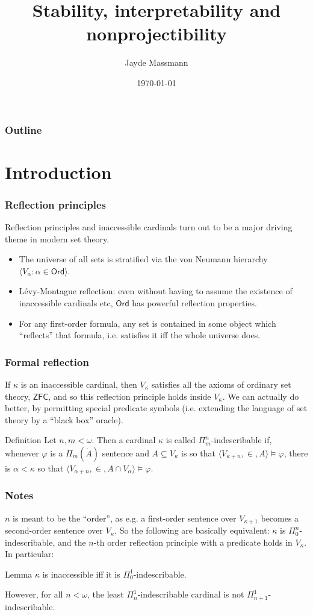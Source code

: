 \documentclass{beamer}
\title{Stability, interpretability and nonprojectibility}
\author{Jayde Massmann}
\date{\today}
\newcommand{\Ord}{\mathsf{Ord}}
\newcommand{\ZFC}{\mathsf{ZFC}}
\begin{document}
\frame{\titlepage}

\begin{frame}
\frametitle{Outline}
\tableofcontents
\end{frame}

\section{Introduction}

\begin{frame}
\frametitle{Reflection principles}
Reflection principles and inaccessible cardinals turn out to be a major driving theme in modern set theory. \pause

\begin{itemize}
    \item The universe of all sets is stratified via the von Neumann hierarchy $\langle V_\alpha: \alpha \in \Ord \rangle$.
    \item Lévy-Montague reflection: even without having to assume the existence of inaccessible cardinals etc, $\Ord$ has powerful reflection properties.
    \item For any first-order formula, any set is contained in some object which ``reflects'' that formula, i.e. satisfies it iff the whole universe does.
\end{itemize}
\end{frame}

\begin{frame}
\frametitle{Formal reflection}
If $\kappa$ is an inaccessible cardinal, then $V_\kappa$ satisfies all the axioms of ordinary set theory, $\ZFC$, and so this reflection principle holds inside $V_\kappa$. We can actually do better, by permitting special predicate symbols (i.e. extending the language of set theory by a ``black box'' oracle).

\begin{block}{Definition}
Let $n, m < \omega$. Then a cardinal $\kappa$ is called $\Pi^n_m$-indescribable if, whenever $\varphi$ is a $\Pi_m(\dot{A})$ sentence and $A \subseteq V_\kappa$ is so that $\langle V_{\kappa+n}, \in, A \rangle \models \varphi$, there is $\alpha < \kappa$ so that $\langle V_{\alpha+n}, \in, A \cap V_\alpha \rangle \models \varphi$.
\end{block}
\end{frame}

\begin{frame}
\frametitle{Notes}
$n$ is meant to be the ``order'', as e.g. a first-order sentence over $V_{\kappa+1}$ becomes a second-order sentence over $V_\kappa$. So the following are basically equivalent: $\kappa$ is $\Pi^n_0$-indescribable, and the $n$-th order reflection principle with a predicate holds in $V_\kappa$. In particular:

\begin{block}{Lemma}
$\kappa$ is inaccessible iff it is $\Pi^1_0$-indescribable.
\end{block}

However, for all $n < \omega$, the least $\Pi^1_n$-indescribable cardinal is not $\Pi^1_{n+1}$-indescribable.
\end{frame}
\end{document}
